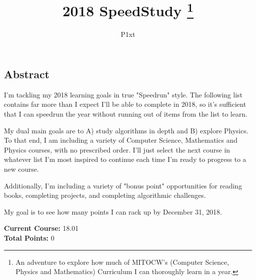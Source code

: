 \begin{titlepage}
\title{2018 SpeedStudy \thanks{An adventure to explore how much of MITOCW's 
(Computer Science, Physics and Mathematics) Curriculum I can thoroughly learn in a year.}}
\author{P1xt }
\maketitle
\section{Abstract}

I'm tackling my 2018 learning goals in true "Speedrun" style. The following list contains far more than I expect I'll be able to complete in 2018, so it's sufficient that I can speedrun the year without running out of items from the list to learn.

My dual main goals are to A) study algorithms in depth and B) explore Physics. To that end, I am including a variety of Computer Science, Mathematics and Physics courses, with no prescribed order. I'll just select the next course in whatever list I'm most inspired to continue each time I'm ready to progress to a new course.

Additionally, I'm including a variety of "bonus point" opportunities for reading books, completing projects, and completing algorithmic challenges.

My goal is to see how many points I can rack up by December 31, 2018.

\textbf{Current Course:} 18.01\\
\textbf{Total Points:} 0


\end{titlepage}
